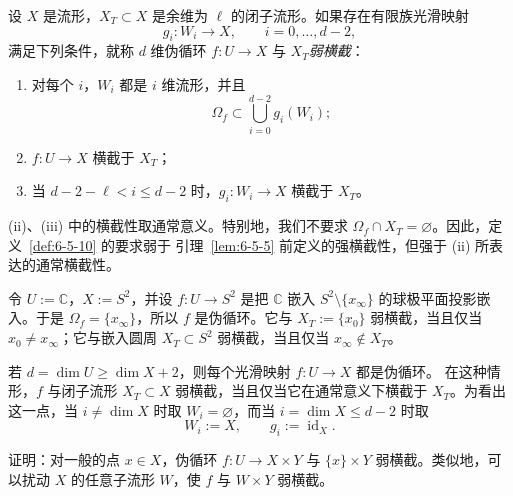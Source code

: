 \begin{definition}\label{def:6-5-10}
设 $X$ 是流形，$X_T\subset X$ 是余维为 $\ell$ 的闭子流形。如果存在有限族光滑映射
\[
  g_i:W_i\longrightarrow X,\qquad i=0,\ldots,d-2,
\]
满足下列条件，就称 $d$ 维伪循环 $f:U\to X$ 与 $X_T$\emph{弱横截}：
\begin{enumerate}[label=(\roman*),leftmargin=3em]
\item 对每个 $i$，$W_i$ 都是 $i$ 维流形，并且
\[
  \Omega_f\subset\bigcup_{i=0}^{d-2}g_i(W_i);
\]
\item $f:U\to X$ 横截于 $X_T$；
\item 当 $d-2-\ell<i\le d-2$ 时，$g_i:W_i\to X$ 横截于 $X_T$。
\end{enumerate}
\end{definition}

(ii)、(iii) 中的横截性取通常意义。特别地，我们不要求
$\Omega_f\cap X_T=\varnothing$。因此，定义~\ref{def:6-5-10} 的要求弱于
引理~\ref{lem:6-5-5} 前定义的强横截性，但强于 (ii) 所表达的通常横截性。

\begin{example}\label{ex:6-5-11}
令 $U:=\mathbb C$，$X:=S^2$，并设 $f:U\to S^2$ 是把 $\mathbb C$ 嵌入
$S^2\setminus\{x_\infty\}$ 的球极平面投影嵌入。于是
$\Omega_f=\{x_\infty\}$，所以 $f$ 是伪循环。它与
$X_T:=\{x_0\}$ 弱横截，当且仅当 $x_0\ne x_\infty$；它与嵌入圆周
$X_T\subset S^2$ 弱横截，当且仅当 $x_\infty\notin X_T$。
\end{example}

\begin{example}\label{ex:6-5-12}
若 $d=\dim U\ge\dim X+2$，则每个光滑映射 $f:U\to X$ 都是伪循环。
在这种情形，$f$ 与闭子流形 $X_T\subset X$ 弱横截，当且仅当它在通常意义下横截于
$X_T$。为看出这一点，当 $i\ne\dim X$ 时取 $W_i=\varnothing$，而当
$i=\dim X\le d-2$ 时取
\[
  W_i:=X,\qquad g_i:=\operatorname{id}_X.
\]
\end{example}

\begin{exercise}\label{ex:6-5-13}
证明：对一般的点 $x\in X$，伪循环 $f:U\to X\times Y$ 与
$\{x\}\times Y$ 弱横截。类似地，可以扰动 $X$ 的任意子流形 $W$，使 $f$ 与
$W\times Y$ 弱横截。
\end{exercise}

